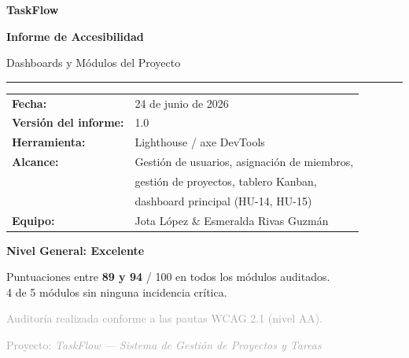 \documentclass[12pt, a4paper]{article}
\begin{document}
\begin{titlepage}
  \centering
  \vspace*{2cm}
  {\huge\bfseries\color{primary} TaskFlow\par}
  \vspace{0.4cm}
  {\LARGE\bfseries Informe de Accesibilidad\par}
  \vspace{0.3cm}
  {\large Dashboards y Módulos del Proyecto\par}
  \vspace{0.8cm}
  \textcolor{bordercolor}{\rule{0.6\linewidth}{0.8pt}}\par
  \vspace{1cm}

  \begin{mdframed}[
    backgroundcolor=sectionbg,
    linecolor=bordercolor,
    linewidth=1pt,
    innerleftmargin=20pt, innerrightmargin=20pt,
    innertopmargin=14pt, innerbottommargin=14pt
  ]
  \begin{tabular}{@{}ll}
    \textbf{Fecha:}               & 24 de junio de 2026 \\[4pt]
    \textbf{Versión del informe:} & 1.0 \\[4pt]
    \textbf{Herramienta:}         & Lighthouse / axe DevTools \\[4pt]
    \textbf{Alcance:}             & Gestión de usuarios, asignación de miembros, \\
                                  & gestión de proyectos, tablero Kanban, \\
                                  & dashboard principal (HU-14, HU-15) \\[4pt]
    \textbf{Equipo:}              & Jota López \& Esmeralda Rivas Guzmán \\
  \end{tabular}
  \end{mdframed}

  \vspace{1.5cm}

  \begin{mdframed}[
    backgroundcolor=lightgreen,
    linecolor=accentgreen,
    linewidth=1.5pt,
    innerleftmargin=16pt, innerrightmargin=16pt,
    innertopmargin=12pt, innerbottommargin=12pt
  ]
  \centering
  {\large\bfseries\color{accentgreen} Nivel General: Excelente}\par
  \vspace{0.3em}
  Puntuaciones entre \textbf{89 y 94} / 100 en todos los módulos auditados.\\
  4 de 5 módulos sin ninguna incidencia crítica.
  \end{mdframed}

  \vfill
  \textcolor{darkgray}{\small Auditoría realizada conforme a las pautas WCAG 2.1 (nivel AA).\par
  Proyecto: \textit{TaskFlow --- Sistema de Gestión de Proyectos y Tareas}}
\end{titlepage}
\end{document}
